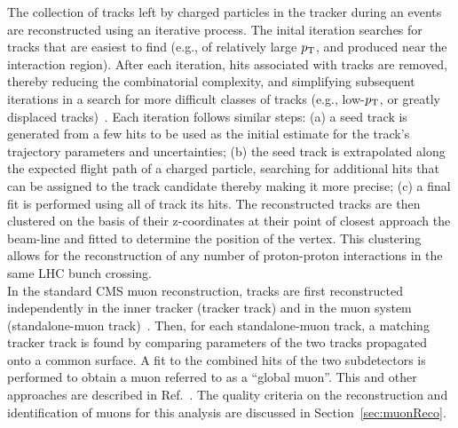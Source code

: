 

\indent The collection of tracks left by charged particles in the tracker during an events are 
reconstructed using an iterative process. The inital iteration searches for tracks 
that are easiest to find (e.g., of relatively large $p_{\mathrm{T}}$, and produced near the 
interaction region). After each iteration, hits associated with tracks are removed, 
thereby reducing the combinatorial complexity, and simplifying subsequent iterations 
in a search for more difficult classes of tracks (e.g., low-$p_{\mathrm{T}}$, or greatly displaced
tracks)~\cite{Chatrchyan:2014fea}. Each iteration follows similar steps: (a) a seed 
track is generated from a few hits to be used as the initial estimate for the track's 
trajectory parameters and uncertainties; (b) the seed track is extrapolated along the 
expected flight path of a charged particle, searching for additional hits that can be 
assigned to the track candidate thereby making it more precise; (c) a final fit is performed 
using all of track its hits. The reconstructed tracks are then clustered on the basis of 
their z-coordinates at their point of closest approach the beam-line and fitted to determine 
the position of the vertex. This clustering allows for the reconstruction of any number 
of proton-proton interactions in the same LHC bunch crossing.\\
\indent In the standard CMS muon reconstruction, tracks are first reconstructed independently 
in the inner tracker (tracker track) and in the muon system (standalone-muon 
track)~\cite{1748-0221-7-10-P10002}. Then, for each standalone-muon track, a matching tracker 
track is found by comparing parameters of the two tracks propagated onto a common surface. A 
fit to the combined hits of the two subdetectors is performed to obtain a muon referred to as 
a ``global muon''. This and other approaches are described in Ref.~\cite{PAS-MUO-10-002}. The 
quality criteria on the reconstruction and identification of muons for this analysis are 
discussed in Section~\ref{sec:muonReco}. \\
